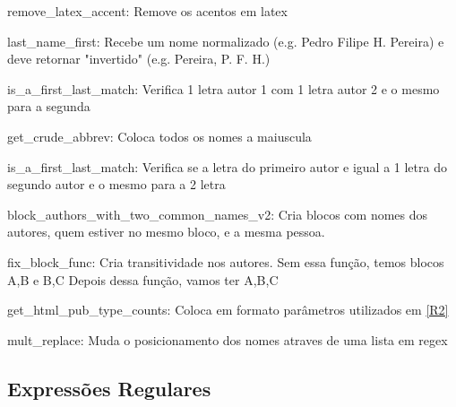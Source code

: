 \documentclass[11pt,a4paper]{report}
\begin{document}
\begin{enumerate*}[label=\textbf{L\arabic*}]
    \item \label{L21}remove\_latex\_accent: Remove os acentos em latex 
    \item \label{L22}last\_name\_first: Recebe um nome normalizado (e.g. Pedro Filipe H. Pereira) e deve retornar "invertido" (e.g. Pereira, P. F. H.)
    \item \label{L23}is\_a\_first\_last\_match: Verifica 1 letra autor 1 com 1 letra autor 2 e o mesmo para a segunda
    \item \label{L24}get\_crude\_abbrev: Coloca todos os nomes a maiuscula
    \item \label{L25}is\_a\_first\_last\_match: Verifica se a letra do primeiro autor e igual a 1 letra do segundo autor e o mesmo para a 2 letra  
    \item \label{L26}block\_authors\_with\_two\_common\_names\_v2: Cria blocos com nomes dos autores, quem estiver no mesmo bloco, e a mesma pessoa.
    \item \label{L27}fix\_block\_func: Cria transitividade nos autores.  Sem essa função, temos blocos {A,B} e {B,C} Depois dessa função, vamos ter {A,B,C}
    \item \label{L28}get\_html\_pub\_type\_counts: Coloca  em formato \htlm parâmetros utilizados em \ref{R2}
    \item \label{L29}mult\_replace: Muda o posicionamento dos nomes atraves de uma lista em regex
\end{enumerate*}

\newpage
\subsection{Expressões Regulares}
\end{document}
